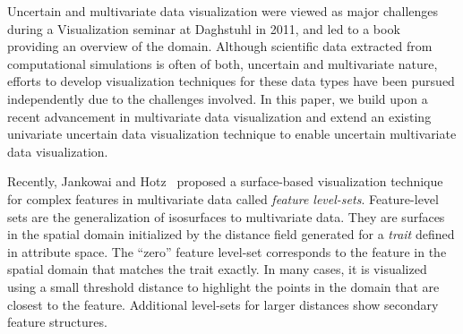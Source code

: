 Uncertain and multivariate data visualization were viewed as major challenges during a Visualization seminar at Daghstuhl in 2011, and led to a book~\cite{hansen2014scientific} providing an overview of the domain. 
%
Although scientific data extracted from computational simulations is often of both, uncertain and multivariate nature, efforts to develop visualization techniques for these data types have been pursued independently due to the challenges involved.
%
In this paper, we build upon a recent advancement in multivariate data visualization and extend an existing univariate uncertain data visualization technique to enable uncertain multivariate data visualization.

Recently, Jankowai and Hotz~\cite{jankowai2020feature} proposed a surface-based visualization technique for  complex features in multivariate data called \textit{feature level-sets}. 
%
Feature-level sets are the generalization of isosurfaces  to multivariate data.
%
They are surfaces in the spatial domain initialized by the distance field  generated for a \textit{trait} defined in attribute space.
%
The ``zero'' feature level-set corresponds to the feature in the spatial domain that matches the trait exactly.
%
In many cases, it is visualized using a small threshold distance to highlight the points in the domain that are closest to the feature.
%
Additional level-sets for larger distances show secondary feature structures. %


